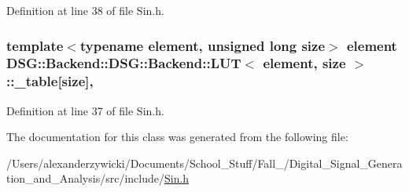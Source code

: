 Definition at line 38 of file Sin.\+h.

\hypertarget{classDSG_1_1Backend_1_1DSG_1_1Backend_1_1LUT_a427da4b7eccdfe25e3c1889a8c2fdea6}{
\subsubsection[{\+\_\+table}]{\setlength{\rightskip}{0pt plus 5cm}template$<$typename element, unsigned long size$>$ element {\bf D\+S\+G\+::\+Backend\+::\+D\+S\+G\+::\+Backend\+::\+L\+U\+T}$<$ element, size $>$\+::\+\_\+table\mbox{[}size\mbox{]}\hspace{0.3cm}{\ttfamily [protected]}, {\ttfamily [inherited]}}}\label{classDSG_1_1Backend_1_1DSG_1_1Backend_1_1LUT_a427da4b7eccdfe25e3c1889a8c2fdea6}


Definition at line 37 of file Sin.\+h.



The documentation for this class was generated from the following file\+:\begin{DoxyCompactItemize}
\item 
/\+Users/alexanderzywicki/\+Documents/\+School\+\_\+\+Stuff/\+Fall\+\_/\+Digital\+\_\+\+Signal\+\_\+\+Generation\+\_\+and\+\_\+\+Analysis/src/include/\hyperlink{Sin_8h}{Sin.\+h}\end{DoxyCompactItemize}
